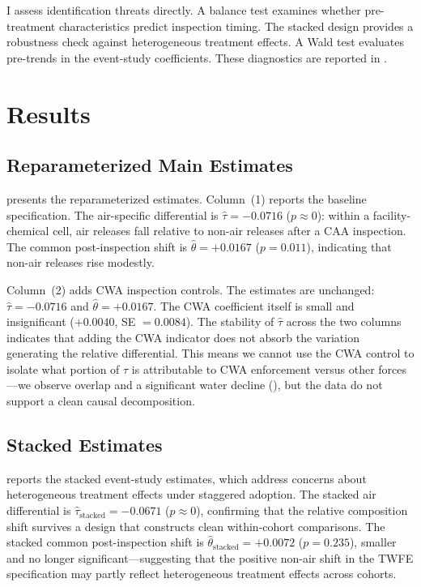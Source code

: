 \documentclass[12pt]{article}
\begin{document}
I assess identification threats directly. A balance test examines whether pre-treatment characteristics predict inspection timing. The stacked design provides a robustness check against heterogeneous treatment effects. A Wald test evaluates pre-trends in the event-study coefficients. These diagnostics are reported in .


\section{Results}
\label{sec:results}

\subsection{Reparameterized Main Estimates}



 presents the reparameterized estimates. Column~(1) reports the baseline specification. The air-specific differential is $\hat{\tau} = -0.0716$ ($p \approx 0$): within a facility-chemical cell, air releases fall relative to non-air releases after a CAA inspection. The common post-inspection shift is $\hat{\theta} = +0.0167$ ($p = 0.011$), indicating that non-air releases rise modestly.

Column~(2) adds CWA inspection controls. The estimates are unchanged: $\hat{\tau} = -0.0716$ and $\hat{\theta} = +0.0167$. The CWA coefficient itself is small and insignificant ($+0.0040$, SE $= 0.0084$). The stability of $\hat{\tau}$ across the two columns indicates that adding the CWA indicator does not absorb the variation generating the relative differential. This means we cannot use the CWA control to isolate what portion of $\tau$ is attributable to CWA enforcement versus other forces---we observe overlap and a significant water decline (), but the data do not support a clean causal decomposition.

\subsection{Stacked Estimates}



 reports the stacked event-study estimates, which address concerns about heterogeneous treatment effects under staggered adoption. The stacked air differential is $\hat{\tau}_{\text{stacked}} = -0.0671$ ($p \approx 0$), confirming that the relative composition shift survives a design that constructs clean within-cohort comparisons. The stacked common post-inspection shift is $\hat{\theta}_{\text{stacked}} = +0.0072$ ($p = 0.235$), smaller and no longer significant---suggesting that the positive non-air shift in the TWFE specification may partly reflect heterogeneous treatment effects across cohorts.
\end{document}
